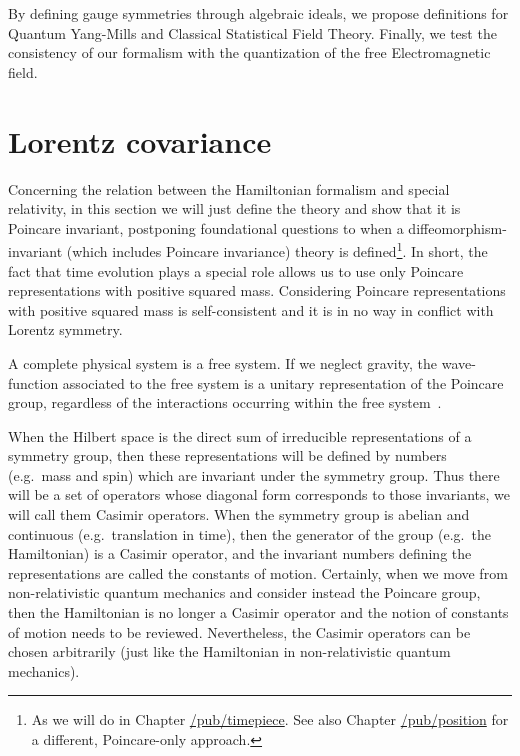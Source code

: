 \documentclass[11pt]{book}
\begin{document}
By defining gauge symmetries through algebraic ideals, we propose
definitions for Quantum Yang-Mills and Classical Statistical Field
Theory. Finally, we test the consistency of our formalism with the
quantization of the free Electromagnetic field.

\hypertarget{lorentz-covariance}{%
\section{Lorentz covariance}\label{lorentz-covariance}}

Concerning the relation between the Hamiltonian formalism and special
relativity, in this section we will just define the theory and show that
it is Poincare invariant, postponing foundational questions to when a
diffeomorphism-invariant (which includes Poincare invariance) theory is
defined\footnote{As we will do in Chapter
  \href{https://timepiece.pubpub.org/pub/timepiece}{/pub/timepiece}. See
  also Chapter
  \href{https://timepiece.pubpub.org/pub/position}{/pub/position} for a
  different, Poincare-only approach.}. In short, the fact that time
evolution plays a special role allows us to use only Poincare
representations with positive squared mass. Considering Poincare
representations with positive squared mass is self-consistent and it is
in no way in conflict with Lorentz symmetry.

A complete physical system is a free system. If we neglect gravity, the
wave-function associated to the free system is a unitary representation
of the Poincare group, regardless of the interactions occurring within
the free system~\cite{Wigner1939On}.

When the Hilbert space is the direct sum of irreducible representations
of a symmetry group, then these representations will be defined by
numbers (e.g.~mass and spin) which are invariant under the symmetry
group. Thus there will be a set of operators whose diagonal form
corresponds to those invariants, we will call them Casimir operators.
When the symmetry group is abelian and continuous (e.g.~translation in
time), then the generator of the group (e.g.~the Hamiltonian) is a
Casimir operator, and the invariant numbers defining the representations
are called the constants of motion. Certainly, when we move from
non-relativistic quantum mechanics and consider instead the Poincare
group, then the Hamiltonian is no longer a Casimir operator and the
notion of constants of motion needs to be reviewed. Nevertheless, the
Casimir operators can be chosen arbitrarily (just like the Hamiltonian
in non-relativistic quantum mechanics).
\end{document}
